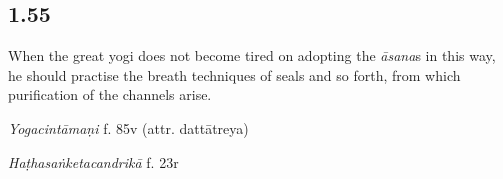 \begin{ekdosis}
\begin{philcomm}[hp01_053]
\end{philcomm}





\subsection*{1.55}
\begin{translation}[hp01_055]
When the great yogi does not become tired on adopting the \emph{āsana}s in this way, he should  practise the breath techniques of seals and so forth, from which purification of the channels arise.%
\end{translation}


\begin{testimonia}[hp01_055]
\emph{Yogacintāmaṇi} f. 85v (attr. dattātreya)

\begin{versinnote}
\end{versinnote}

\emph{Haṭhasaṅketacandrikā} f. 23r

\begin{versinnote}
\tl{\var{nāḍiśuddhiṃ ] \emph{em.}, nāhiśuddhi ms. no. 2244}\\!}
\end{versinnote}


\end{testimonia}
\end{ekdosis}
